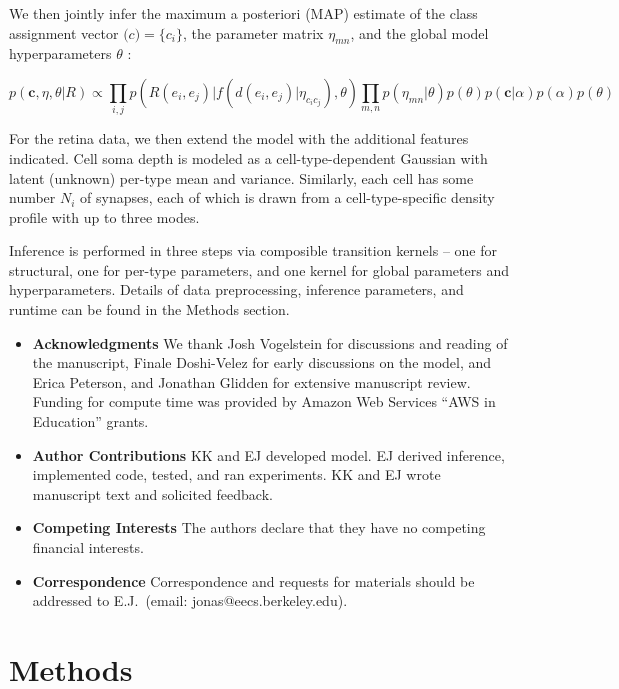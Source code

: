 \documentclass{article}
\renewcommand{\vec}[1]{\mathbf{#1}}
\begin{document}
We then jointly infer the maximum a posteriori (MAP) estimate of the
class assignment vector $\vec(c) = \{c_i\}$, the parameter matrix
$\eta_{mn}$, and the global model hyperparameters $\theta$ :

\begin{equation}
  p(\vec{c}, \eta, \theta | R ) \propto \prod_{i, j} p(R(e_i, e_j) | f(d(e_i, e_j) | \eta_{c_ic_j}), \theta) \prod_{m, n} p(\eta_{mn} | \theta)  p(\theta) p(\vec{c} | \alpha) p(\alpha) p(\theta)
\end{equation}

For the retina data, we then extend the model with the additional
features indicated. Cell soma depth is modeled as a
cell-type-dependent Gaussian with latent (unknown) per-type mean and
variance. Similarly, each cell has some number $N_i$ of synapses, 
each of which is drawn from a cell-type-specific density profile
with up to three modes.


Inference is performed in three steps via composible transition 
kernels -- one for structural, one for per-type parameters, and
one kernel for global parameters and hyperparameters. Details
of data preprocessing, inference parameters, and runtime can
be found in the Methods section. 

\printbibliography

\begin{itemize}

 \item \textbf{Acknowledgments} We thank Josh Vogelstein for discussions and reading of the manuscript, Finale Doshi-Velez for early discussions on the model, and Erica Peterson, and Jonathan Glidden for extensive manuscript review. Funding for compute time was provided by Amazon Web Services ``AWS in Education'' grants. 
\item \textbf{Author Contributions} KK and EJ developed model. EJ derived inference, implemented code, tested, and ran experiments. KK and EJ wrote manuscript text and solicited feedback. 
 \item \textbf{Competing Interests} The authors declare that they have no
competing financial interests.
 \item \textbf{Correspondence} Correspondence and requests for materials
should be addressed to E.J.~(email: jonas@eecs.berkeley.edu).
\end{itemize}

\newpage
\section{Methods }
\end{document}
